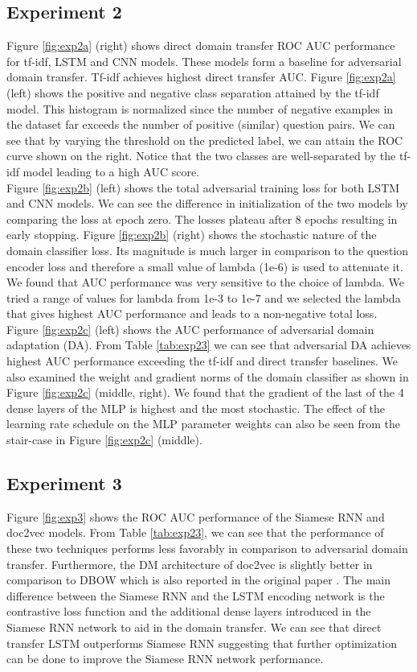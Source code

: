\documentclass{sigkddExp}
\begin{document}
\subsection{Experiment 2}
{\color{red} Figure \ref{fig:exp2a} (right) shows direct domain transfer ROC AUC performance for tf-idf, LSTM and CNN models. These models form a baseline for adversarial domain transfer. Tf-idf achieves highest direct transfer AUC. Figure \ref{fig:exp2a} (left) shows the positive and negative class separation attained by the tf-idf model. This histogram is normalized since the number of negative examples in the dataset far exceeds the number of positive (similar) question pairs. We can see that by varying the threshold on the predicted label, we can attain the ROC curve shown on the right. Notice that the two classes are well-separated by the tf-idf model leading to a high AUC score.\\
Figure \ref{fig:exp2b} (left) shows the total adversarial training loss for both LSTM and CNN models. We can see the difference in initialization of the two models by comparing the loss at epoch zero. The losses plateau after 8 epochs resulting in early stopping. Figure \ref{fig:exp2b} (right) shows the stochastic nature of the domain classifier loss. Its magnitude is much larger in comparison to the question encoder loss and therefore a small value of lambda (1e-6) is used to attenuate it. We found that AUC performance was very sensitive to the choice of lambda. We tried a range of values for lambda from 1e-3 to 1e-7 and we selected the lambda that gives highest AUC performance and leads to a non-negative total loss.\\
Figure \ref{fig:exp2c} (left) shows the AUC performance of adversarial domain adaptation (DA). From Table \ref{tab:exp23} we can see that adversarial DA achieves highest AUC performance exceeding the tf-idf and direct transfer baselines. We also examined the weight and gradient norms of the domain classifier as shown in Figure \ref{fig:exp2c} (middle, right). We found that the gradient of the last of the 4 dense layers of the MLP is highest and the most stochastic. The effect of the learning rate schedule on the MLP parameter weights can also be seen from the stair-case in Figure \ref{fig:exp2c} (middle). 
}

\subsection{Experiment 3}
{\color{red} Figure \ref{fig:exp3} shows the ROC AUC performance of the Siamese RNN and doc2vec models. From Table \ref{tab:exp23}, we can see that the performance of these two techniques performs less favorably in comparison to adversarial domain transfer. Furthermore, the DM architecture of doc2vec is slightly better in comparison to DBOW which is also reported in the original paper \cite{doc2vec_paper}. The main difference between the Siamese RNN and the LSTM encoding network is the contrastive loss function and the additional dense layers introduced in the Siamese RNN network to aid in the domain transfer. We can see that direct transfer LSTM outperforms Siamese RNN suggesting that further optimization can be done to improve the Siamese RNN network performance.}
\end{document}
